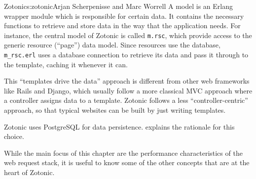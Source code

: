 \begin{aosachapter}{Zotonic}{s:zotonic}{Arjan Scherpenisse and Marc Worrell}
A model is an Erlang wrapper module which is responsible for certain
data. It contains the necessary functions to retrieve and store data in
the way that the application needs. For instance, the central model of
Zotonic is called \texttt{m.rsc}, which provide access to the generic
resource (``page'') data model. Since resources use the database,
\texttt{m\_rsc.erl} uses a database connection to retrieve its data and
pass it through to the template, caching it whenever it can.

This ``templates drive the data'' approach is different from other web
frameworks like Rails and Django, which usually follow a more classical
MVC approach where a controller assigns data to a template. Zotonic
follows a less ``controller-centric'' approach, so that typical websites
can be built by just writing templates.

Zotonic uses PostgreSQL for data persistence.
 explains the rationale for this choice.


While the main focus of this chapter are the performance characteristics
of the web request stack, it is useful to know some of the other
concepts that are at the heart of Zotonic.


\end{aosachapter}
